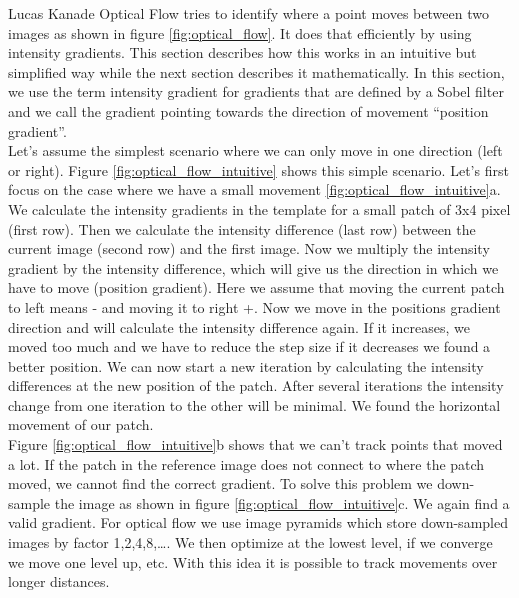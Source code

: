 \documentclass[11pt,a4paper,titlepage,oneside]{report}
\begin{document}
Lucas Kanade Optical Flow tries to identify where a point moves between two images as shown in figure \ref{fig:optical_flow}. It does that efficiently by using intensity gradients. This section describes how this works in an intuitive but simplified way while the next section describes it mathematically. In this section, we use the term intensity gradient for gradients that are defined by a Sobel filter and we call the gradient pointing towards the direction of movement ``position gradient''.\\
Let's assume the simplest scenario where we can only move in one direction (left or right). Figure \ref{fig:optical_flow_intuitive} shows this simple scenario. Let's first focus on the case where we have a small movement \ref{fig:optical_flow_intuitive}a. We calculate the intensity gradients in the template for a small patch of 3x4 pixel (first row). Then we calculate the intensity difference (last row) between the current image (second row) and the first image. Now we multiply the intensity gradient by the intensity difference, which will give us the direction in which we have to move (position gradient). Here we assume that moving the current patch to left means - and moving it to right +. Now we move in the positions gradient direction and will calculate the intensity difference again. If it increases, we moved too much and we have to reduce the step size if it decreases we found a better position. We can now start a new iteration by calculating the intensity differences at the new position of the patch. After several iterations the intensity change from one iteration to the other will be minimal. We found the horizontal movement of our patch.\\
Figure \ref{fig:optical_flow_intuitive}b shows that we can't track points that moved a lot. If the patch in the reference image does not connect to where the patch moved, we cannot find the correct gradient. To solve this problem we down-sample the image as shown in figure \ref{fig:optical_flow_intuitive}c. We again find a valid gradient. For optical flow we use image pyramids \cite{rvc} which store down-sampled images by factor 1,2,4,8,\dots. We then optimize at the lowest level, if we converge we move one level up, etc. With this idea it is possible to track movements over longer distances.
\end{document}
